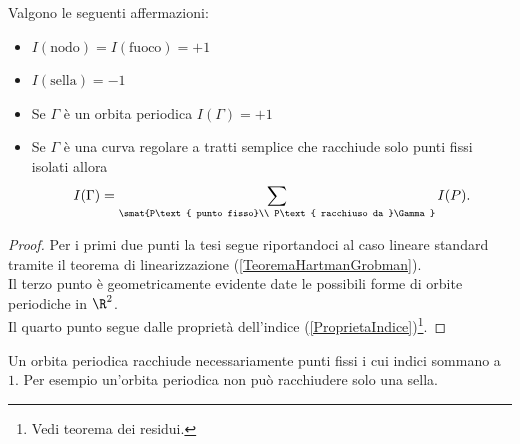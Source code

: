 \begin{proposition}\label{IndiciDiAlcuniPuntiFissi}
Valgono le seguenti affermazioni:
\begin{itemize}
\item $I(\text{nodo})=I(\text{fuoco})=+1$
\item $I(\text{sella})=-1$
\item Se $\Gamma$ \`e un orbita periodica $I(\Gamma)=+1$
\item Se $\Gamma$ \`e una curva regolare a tratti semplice che racchiude solo punti fissi isolati allora 
\[I(\Gamma)=\sum_{\smat{P\text{ punto fisso}\\ P\text{ racchiuso da }\Gamma}}I(P).\]
\end{itemize}
\end{proposition}
\begin{proof}
Per i primi due punti la tesi segue riportandoci al caso lineare standard tramite il teorema di linearizzazione (\ref{TeoremaHartmanGrobman}).\\
Il terzo punto \`e geometricamente evidente date le possibili forme di orbite periodiche in $\R^2$.\\
Il quarto punto segue dalle propriet\`a dell'indice (\ref{ProprietaIndice})\footnote{Vedi teorema dei residui.}.
\end{proof}

\begin{remark}
Un orbita periodica racchiude necessariamente punti fissi i cui indici sommano a $1$. Per esempio un'orbita periodica non pu\`o racchiudere solo una sella.
\end{remark}

